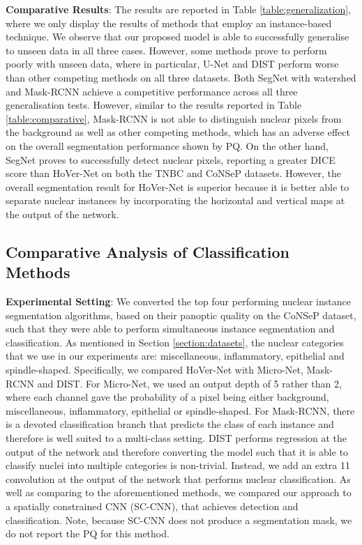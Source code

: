 \documentclass[journal]{IEEEtran}
\begin{document}
	
	\textbf{Comparative Results}: The results are reported in Table \ref{table:generalization}, where we only display the results of methods that employ an instance-based technique. We observe that our proposed model is able to successfully generalise to unseen data in all three cases. However, some methods prove to perform poorly with unseen data, where in particular, U-Net and DIST perform worse than other competing methods on all three datasets. Both SegNet with watershed and Mask-RCNN achieve a competitive performance across all three generalisation tests. However, similar to the results reported in Table \ref{table:comparative}, Mask-RCNN is not able to distinguish nuclear pixels from the background as well as other competing methods, which has an adverse effect on the overall segmentation performance shown by PQ. On the other hand, SegNet proves to successfully detect nuclear pixels, reporting a greater DICE score than HoVer-Net on both the TNBC and CoNSeP datasets. However, the overall segmentation result for HoVer-Net is superior because it is better able to separate nuclear instances by incorporating the horizontal and vertical maps at the output of the network. 

	\subsection{Comparative Analysis of Classification Methods} \label{section:comparison_class}
	
	\textbf{Experimental Setting}: We converted the top four performing nuclear instance segmentation algorithms, based on their panoptic quality on the CoNSeP dataset, such that they were able to perform simultaneous instance segmentation and classification. As mentioned in Section \ref{section:datasets}, the nuclear categories that we use in our experiments are: miscellaneous, inflammatory, epithelial and spindle-shaped. Specifically, we compared HoVer-Net with Micro-Net, Mask-RCNN and DIST. For Micro-Net, we used an output depth of 5 rather than 2, where each channel gave the probability of a pixel being either background, miscellaneous, inflammatory, epithelial or spindle-shaped. For Mask-RCNN, there is a devoted classification branch that predicts the class of each instance and therefore is well suited to a multi-class setting. DIST performs regression at the output of the network and therefore converting the model such that it is able to classify nuclei into multiple categories is non-trivial. Instead, we add an extra 11 convolution at the output of the network that performs nuclear classification. As well as comparing to the aforementioned methods, we compared our approach to a spatially constrained CNN (SC-CNN), that achieves detection and classification. Note, because SC-CNN does not produce a segmentation mask, we do not report the PQ for this method.
	
\end{document}
